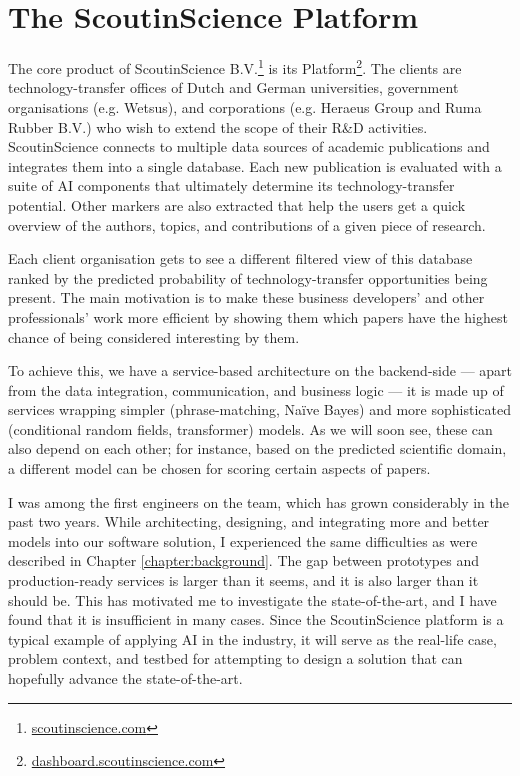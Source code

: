 \chapter{The ScoutinScience Platform} \label{chapter:case}

The core product of ScoutinScience B.V.\footnote{\href{https://scoutinscience.com/}{scoutinscience.com}} is its Platform\footnote{\href{https://dashboard.scoutinscience.com/}{dashboard.scoutinscience.com}}. The clients are technology-transfer offices of Dutch and German universities, government organisations (e.g. Wetsus), and corporations (e.g. Heraeus Group and Ruma Rubber B.V.) who wish to extend the scope of their R\&D activities. ScoutinScience connects to multiple data sources of academic publications and integrates them into a single database. Each new publication is evaluated with a suite of AI components that ultimately determine its technology-transfer potential. Other markers are also extracted that help the users get a quick overview of the authors, topics, and contributions of a given piece of research.

Each client organisation gets to see a different filtered view of this database ranked by the predicted probability of technology-transfer opportunities being present. The main motivation is to make these business developers' and other professionals' work more efficient by showing them which papers have the highest chance of being considered interesting by them. 

To achieve this, we have a service-based architecture \cite{kleppmann2017designing} on the backend-side --- apart from the data integration, communication, and business logic --- it is made up of services wrapping simpler (phrase-matching, Naïve Bayes) and more sophisticated (conditional random fields, transformer) models. As we will soon see, these can also depend on each other; for instance, based on the predicted scientific domain, a different model can be chosen for scoring certain aspects of papers.

I was among the first engineers on the team, which has grown considerably in the past two years. While architecting, designing, and integrating more and better models into our software solution, I experienced the same difficulties as were described in Chapter \ref{chapter:background}. The gap between prototypes and production-ready services is larger than it seems, and it is also larger than it should be. This has motivated me to investigate the state-of-the-art, and I have found that it is insufficient in many cases. Since the ScoutinScience platform is a typical example of applying AI in the industry, it will serve as the real-life case, problem context, and testbed for attempting to design a solution that can hopefully advance the state-of-the-art.

